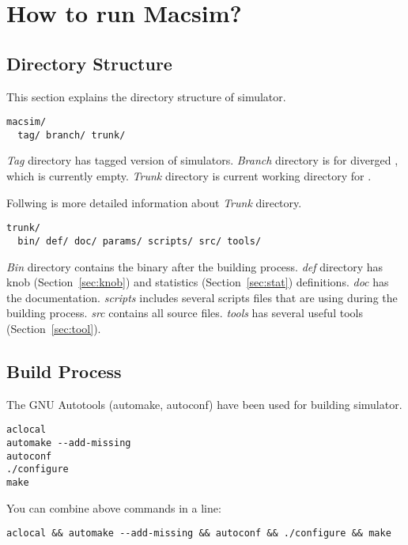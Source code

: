 
\clearpage
\section{How to run Macsim?}

\subsection{Directory Structure}

This section explains the directory structure of \SIM simulator.

\smallskip
\begin{lstlisting}
macsim/
  tag/ branch/ trunk/
\end{lstlisting}
\smallskip

\textit{Tag} directory has tagged version of \SIM
simulators. \textit{Branch} directory is for diverged \SIM, which is
currently empty. \textit{Trunk} directory is current working directory
for \SIM.

Follwing is more detailed information about \textit{Trunk} directory.

\smallskip
\begin{lstlisting}
trunk/
  bin/ def/ doc/ params/ scripts/ src/ tools/
\end{lstlisting}
\smallskip

\textit{Bin} directory contains the \SIM binary after the building
process. \textit{def} directory has knob (Section~\ref{sec:knob}) and
statistics (Section~\ref{sec:stat}) definitions. \textit{doc} has the
documentation. \textit{scripts} includes several scripts files that
are using during the building process. \textit{src} contains all
source files. \textit{tools} has several useful tools
(Section~\ref{sec:tool}).



\subsection{Build Process}

The GNU Autotools (automake, autoconf) have been used for building
\SIM simulator. 

\smallskip
\begin{lstlisting}
aclocal
automake --add-missing
autoconf
./configure
make
\end{lstlisting}
\smallskip

You can combine above commands in a line:

\smallskip
\begin{lstlisting}
aclocal && automake --add-missing && autoconf && ./configure && make
\end{lstlisting}
\smallskip

